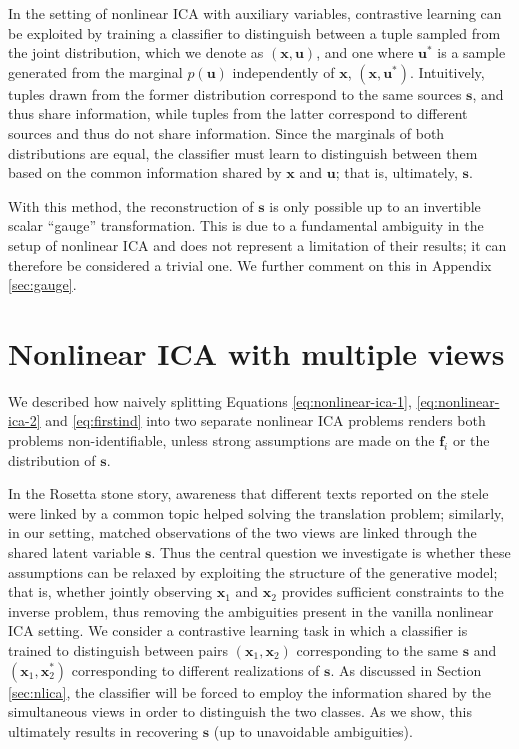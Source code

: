 In the setting of nonlinear ICA with auxiliary variables, contrastive learning can be exploited by training a classifier to distinguish between a tuple sampled from the joint distribution, which we denote as $(\bm{x}, \bm{u})$, and one where $\bm{u}^*$ is a sample generated from the marginal $p(\bm{u})$ independently of $\bm{x}$, $(\bm{x}, \bm{u}^*)$.
Intuitively, tuples drawn from the former distribution correspond to the same sources $\bm{s}$, and thus share information, while tuples from the latter correspond to different sources and thus do not share information.
Since the marginals of both distributions are equal, the classifier must learn to distinguish between them based on the common information shared by $\bm{x}$ and $\bm{u}$; that is, ultimately, $\bm{s}$.

With this method, the reconstruction of $\bm{s}$ is only possible up to an invertible scalar ``gauge'' transformation. This is due to a fundamental ambiguity in the setup of nonlinear ICA and does not represent a limitation of their results; it can therefore be considered a trivial one. We further comment on this in Appendix \ref{sec:gauge}.

\section{Nonlinear ICA with multiple views}
\label{sec:nlica-with-multiple-views}


We described how naively splitting Equations \ref{eq:nonlinear-ica-1}, \ref{eq:nonlinear-ica-2} and \ref{eq:firstind} into two separate nonlinear ICA problems renders both problems non-identifiable, unless strong assumptions are made on the $\bm{f}_i$ or the distribution of $\bm{s}$.



In the Rosetta stone story, awareness that different texts reported on the stele were linked by a common topic helped solving the translation problem; similarly, in our setting, matched observations of the two views are linked through the shared latent variable $\bm{s}$. Thus the central question we investigate is whether these assumptions can be relaxed by exploiting the structure of the generative model; that is, whether jointly observing $\bm{x}_1$ and $\bm{x}_2$ provides sufficient constraints to the inverse problem, thus removing the ambiguities present in the vanilla nonlinear ICA setting.
We consider a contrastive learning task in which a classifier is trained to distinguish between pairs $(\bm{x}_1, \bm{x}_2)$ corresponding to the same $\bm{s}$ and $(\bm{x}_1, \bm{x}^*_2)$ corresponding to different realizations of $\bm{s}$.
As discussed in Section \ref{sec:nlica}, the classifier will be forced to employ the information shared by the simultaneous views in order to distinguish the two classes.
As we show, this ultimately results in recovering $\bm{s}$ (up to unavoidable ambiguities).




